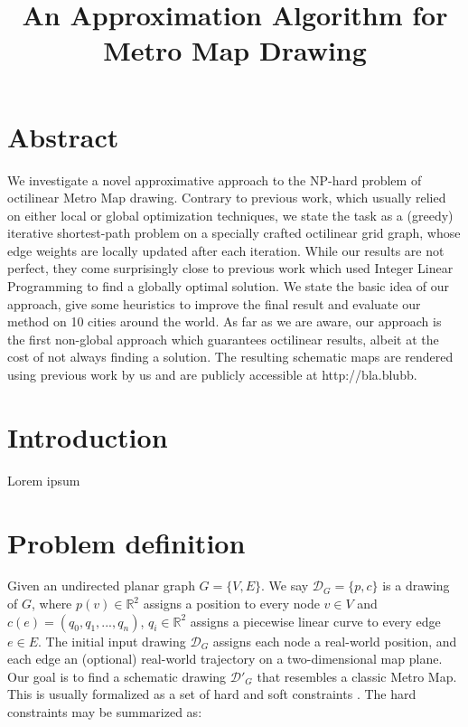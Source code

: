 \documentclass{sig-alternate-sigmod09}
\begin{document}
\title{An Approximation Algorithm for Metro Map Drawing}


\maketitle

\section{Abstract}

We investigate a novel approximative approach to the NP-hard problem of octilinear Metro Map drawing. Contrary to previous work, which usually relied on either local or global optimization techniques, we state the task as a (greedy) iterative shortest-path problem on a specially crafted octilinear grid graph, whose edge weights are locally updated after each iteration. While our results are not perfect, they come surprisingly close to previous work which used Integer Linear Programming to find a globally optimal solution. We state the basic idea of our approach, give some heuristics to improve the final result and evaluate our method on 10 cities around the world. As far as we are aware, our approach is the first non-global approach which guarantees octilinear results, albeit at the cost of not always finding a solution. The resulting schematic maps are rendered using previous work by us and are publicly accessible at http://bla.blubb. 

\section{Introduction}

Lorem ipsum 

\section{Problem definition}

Given an undirected planar graph $G = \{V, E\}$. We say $\mathcal{D}_G = \{p, c\}$ is a drawing of $G$, where $p(v) \in \mathbb{R}^2$ assigns a position to every node $v \in V$ and $c(e) = (q_0, q_1, ..., q_n)$, $q_i \in \mathbb{R}^2$ assigns a piecewise linear curve to every edge $e \in E$. The initial input drawing $\mathcal{D}_G$ assigns each node a real-world position, and each edge an (optional) real-world trajectory on a two-dimensional map plane. Our goal is to find a schematic drawing $\mathcal{D}'_G$ that resembles a classic Metro Map. This is usually formalized as a set of hard and soft constraints \cite{nb, ...}. The hard constraints may be summarized as:
\end{document}
